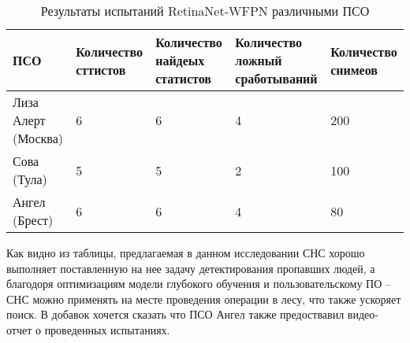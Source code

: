 \begin{table}[H]
    \caption{Результаты испытаний RetinaNet-WFPN различными ПСО}\label{leaderboard-full}
    \begin{tabular}{|p{2.8cm}|p{3cm}|p{3cm}|p{3cm}|p{3cm}|}
        \hline
        {ПСО} & {Количество сттистов} & {Количество найдеых статистов} & {Количество ложный сработываний} & {Количество снимеов} \\
        \hline
        Лиза Алерт (Москва) & 6 & 6 & 4 & 200 \\
        \hline
        Сова (Тула) & 5 & 5 & 2 & 100 \\
        \hline
        Ангел (Брест) & 6 & 6 & 4 & 80 \\
        \hline
    \end{tabular}
\end{table}

Как видно из таблицы, предлагаемая в данном исследовании СНС хорошо выполняет поставленную на нее задачу детектирования пропавших людей, а благодоря оптимизациям модели глубокого обучения и пользовательскому ПО -- СНС можно применять на месте проведения операции в лесу, что также ускоряет поиск. В добавок хочется сказать что ПСО Ангел также предоствавил видео-отчет о проведенных испытаниях.